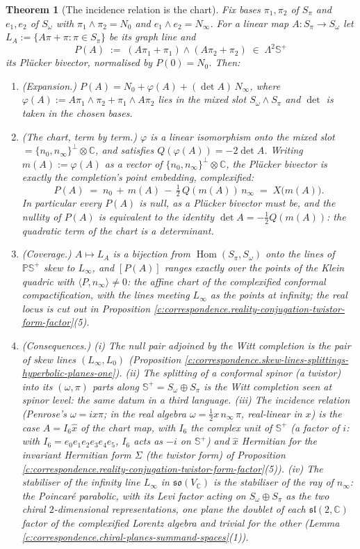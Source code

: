 \documentclass[11pt]{article}
\newtheorem{theorem}{Theorem}[section]
\theoremstyle{definition}
\theoremstyle{plain}
\newcommand{\changedmark}[2]{\marginpar{\raggedright\scriptsize\color{#1}#2}}
\providecommand{\C}{}\renewcommand{\C}{\mathbb{C}}
\providecommand{\CS}{}\renewcommand{\CS}{{\mathbb{S}^{+}}}
\providecommand{\PCS}{}\renewcommand{\PCS}{\mathbb{P}{\mathbb{S}^{+}}}
\providecommand{\Som}{}\renewcommand{\Som}{S_\omega}
\providecommand{\Spi}{}\renewcommand{\Spi}{S_\pi}
\providecommand{\nInf}{}\renewcommand{\nInf}{n_\infty}
\providecommand{\nO}{}\renewcommand{\nO}{n_0}
\providecommand{\ip}{}\renewcommand{\ip}[2]{\langle #1, #2\rangle}
\begin{document}
\begin{theorem}[The incidence relation is the chart]\label{c:correspondence.incidence-relation-chart}
\changedmark{BurntOrange}{changed since the deposit}
Fix bases $\pi_1, \pi_2$ of $\Spi$ and $e_1, e_2$ of $\Som$ with $\pi_1\wedge\pi_2 = N_0$ and $e_1 \wedge e_2 = N_\infty$. For a linear map $A: \Spi \to \Som$ let $L_A := \{A\pi + \pi : \pi \in \Spi\}$ be its graph line and
\[
P(A) \;:=\; (A\pi_1 + \pi_1)\wedge(A\pi_2 + \pi_2) \;\in\; \Lambda^2\CS
\]
its Pl\"ucker bivector, normalised by $P(0) = N_0$. Then:
\begin{enumerate}
\item \emph{(Expansion.)} $P(A) = N_0 + \varphi(A) + (\det A)\, N_\infty$, where $\varphi(A) := A\pi_1\wedge\pi_2 + \pi_1\wedge A\pi_2$ lies in the mixed slot $\Som\wedge\Spi$ and $\det$ is taken in the chosen bases.
\item \emph{(The chart, term by term.)} $\varphi$ is a linear isomorphism onto the mixed slot $= \{\nO,\nInf\}^\perp \otimes \C$, and satisfies $Q(\varphi(A)) = -2\det A$. Writing $m(A) := \varphi(A)$ as a vector of $\{\nO,\nInf\}^\perp\otimes\C$, the Pl\"ucker bivector is exactly the completion's point embedding, complexified:
\[
P(A) \;=\; \nO \,+\, m(A)\,-\,\tfrac12\,Q(m(A))\,\nInf \;=\; X\bigl(m(A)\bigr).
\]
In particular every $P(A)$ is null, as a Pl\"ucker bivector must be, and the nullity of $P(A)$ is equivalent to the identity $\det A = -\tfrac12Q(m(A))$: the quadratic term of the chart is a determinant.
\item \emph{(Coverage.)} $A \mapsto L_A$ is a bijection from $\operatorname{Hom}(\Spi, \Som)$ onto the lines of $\PCS$ skew to $L_\infty$, and $[P(A)]$ ranges exactly over the points of the Klein quadric with $\ip{P}{\nInf} \neq 0$: the affine chart of the complexified conformal compactification, with the lines meeting $L_\infty$ as the points at infinity; the real locus is cut out in Proposition \ref{c:correspondence.reality-conjugation-twistor-form-factor}(5).
\item \emph{(Consequences.)} (i) The null pair adjoined by the Witt completion is the pair of skew lines $(L_\infty, L_0)$ (Proposition \ref{c:correspondence.skew-lines-splittings-hyperbolic-planes-one}). (ii) The splitting of a conformal spinor (a twistor) into its $(\omega, \pi)$ parts along $\CS = \Som\oplus\Spi$ is the Witt completion seen at spinor level: the same datum in a third language. (iii) The incidence relation (Penrose's $\omega = ix\pi$; in the real algebra $\omega = \tfrac12 x\,\nInf\,\pi$, real-linear in $x$) is the case $A = I_6\hat x$ of the chart map, with $I_6$ the complex unit of $\CS$ (a factor of $i$: with $I_6 = e_0e_1e_2e_3e_4e_5$, $I_6$ acts as $-i$ on $\CS$) and $\hat x$ Hermitian for the invariant Hermitian form $\Sigma$ (the twistor form) of Proposition \ref{c:correspondence.reality-conjugation-twistor-form-factor}(5)). (iv) The stabiliser of the infinity line $L_\infty$ in $\mathfrak{so}(V_\C)$ is the stabiliser of the ray of $\nInf$: the Poincar\'e parabolic, with its Levi factor acting on $\Som \oplus \Spi$ as the two chiral $2$-dimensional representations, one plane the doublet of each $\mathfrak{sl}(2,\C)$ factor of the complexified Lorentz algebra and trivial for the other (Lemma \ref{c:correspondence.chiral-planes-summand-spaces}(1)).

\end{enumerate}
\end{theorem}
\end{document}
